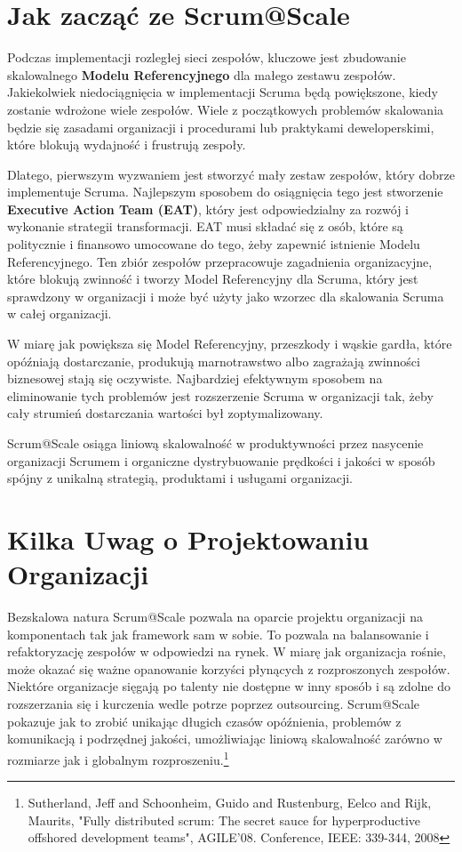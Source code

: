 \documentclass[12pt,a4paper,parskip=full]{scrartcl}
\begin{document}
\section{Jak zacząć ze Scrum@Scale}

Podczas implementacji rozległej sieci zespołów, kluczowe jest zbudowanie skalowalnego \textbf{Modelu Referencyjnego} dla małego zestawu zespołów. 
Jakiekolwiek niedociągnięcia w implementacji Scruma będą powiększone, kiedy zostanie wdrożone wiele zespołów. Wiele z początkowych problemów skalowania będzie się zasadami organizacji i procedurami lub praktykami deweloperskimi, które blokują wydajność i frustrują zespoły.

Dlatego, pierwszym wyzwaniem jest stworzyć mały zestaw zespołów, który dobrze implementuje Scruma. Najlepszym sposobem do osiągnięcia tego jest stworzenie \textbf{Executive Action Team (EAT)}, który jest odpowiedzialny za rozwój i wykonanie strategii transformacji. EAT musi składać się z osób, które są politycznie i finansowo umocowane do tego, żeby zapewnić istnienie Modelu Referencyjnego. Ten zbiór zespołów przepracowuje zagadnienia organizacyjne, które blokują zwinność i tworzy Model Referencyjny dla Scruma, który jest sprawdzony w organizacji i może być użyty jako wzorzec dla skalowania Scruma w całej organizacji.

W miarę jak powiększa się Model Referencyjny, przeszkody i wąskie gardła, które opóźniają dostarczanie, produkują marnotrawstwo albo zagrażają zwinności biznesowej stają się oczywiste. Najbardziej efektywnym sposobem na eliminowanie tych problemów jest rozszerzenie Scruma w organizacji tak, żeby cały strumień dostarczania wartości był zoptymalizowany.

Scrum@Scale osiąga liniową skalowalność w produktywności przez nasycenie organizacji Scrumem i organiczne dystrybuowanie prędkości i jakości w sposób spójny z unikalną strategią, produktami i usługami organizacji.

\section{Kilka Uwag o Projektowaniu Organizacji}

Bezskalowa natura Scrum@Scale pozwala na oparcie projektu organizacji na komponentach tak jak framework sam w sobie. To pozwala na balansowanie i refaktoryzację zespołów w odpowiedzi na rynek. W miarę jak organizacja rośnie, może okazać się ważne opanowanie korzyści płynących z rozproszonych zespołów. Niektóre organizacje sięgają po talenty nie dostępne w inny sposób i są zdolne do rozszerzania się i kurczenia wedle potrze poprzez outsourcing. Scrum@Scale pokazuje jak to zrobić unikając długich czasów opóźnienia, problemów z komunikacją i podrzędnej jakości, umożliwiając liniową skalowalność zarówno w rozmiarze jak i globalnym rozproszeniu.\footnote{Sutherland, Jeff and Schoonheim, Guido and Rustenburg, Eelco and Rijk, Maurits, "Fully distributed scrum: The secret sauce for hyperproductive offshored development teams", AGILE'08. Conference, IEEE: 339-344, 2008}
\end{document}
